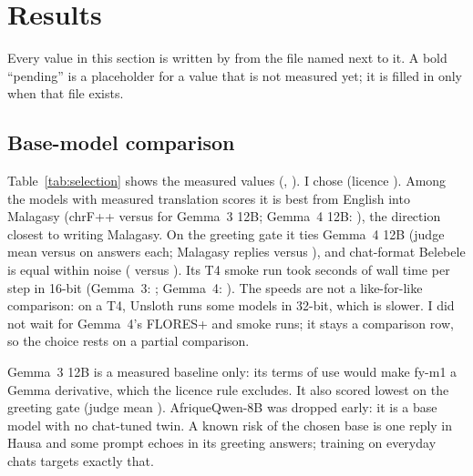\documentclass[11pt]{article}
\begin{document}
\section{Results}
\label{sec:results}
Every value in this section is written by  from the  file named
next to it. A bold ``pending'' is a placeholder for a value that is not measured yet; it is filled in only
when that file exists.

\subsection{Base-model comparison}
\label{sec:res-selection}
Table~\ref{tab:selection} shows the measured values (,
). I chose \fyBaseModel{} (licence \fyBaseLicense{}). Among the models
with measured translation scores it is best from English into Malagasy (chrF++ \fySelQwenChrfEnMg{}
versus \fySelGemmaThreeChrfEnMg{} for Gemma~3 12B; Gemma~4 12B: \fySelGemmaFourChrfEnMg{}), the direction
closest to writing Malagasy. On the greeting gate it ties Gemma~4 12B (judge mean \fyGreetQwenMean{}
versus \fyGreetGemmaFourMean{} on \fyGreetAnswers{} answers each; Malagasy replies \fyGreetQwenMalagasy{}
versus \fyGreetGemmaFourMalagasy{}), and chat-format Belebele is equal within noise
(\fySelQwenBelebeleChat{} versus \fySelGemmaFourBelebeleChat{}). Its T4 smoke run took
\fySelQwenSecStep{} seconds of wall time per step in 16-bit (Gemma~3: \fySelGemmaThreeSecStep{}; Gemma~4:
\fySelGemmaFourSecStep{}). The speeds are not a like-for-like comparison: on a T4, Unsloth runs some
models in 32-bit, which is slower. I did not wait for Gemma~4's FLORES+ and smoke runs; it stays a
comparison row, so the choice rests on a partial comparison.

Gemma~3 12B \citep{gemma3} is a measured baseline only: its terms of use would make fy-m1 a Gemma
derivative, which the licence rule excludes. It also scored lowest on the greeting gate (judge mean
\fyGreetGemmaThreeMean{}). AfriqueQwen-8B was dropped early: it is a base model with no chat-tuned twin.
A known risk of the chosen base is one reply in Hausa and some prompt echoes in its greeting answers;
training on everyday chats targets exactly that.
\end{document}
